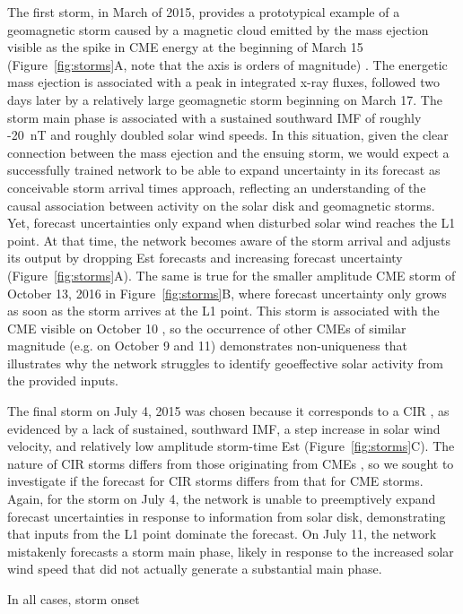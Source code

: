 The first storm, in March of 2015, provides a prototypical example of a geomagnetic storm caused by a magnetic cloud emitted by the mass ejection visible as the spike in CME energy at the beginning of March 15 (Figure~\ref{fig:storms}A, note that the axis is orders of magnitude) \citep{Patel2019}. The energetic mass ejection is associated with a peak in integrated x-ray fluxes, followed two days later by a relatively large geomagnetic storm beginning on March 17. The storm main phase is associated with a sustained southward IMF of roughly -20~nT and roughly doubled solar wind speeds. In this situation, given the clear connection between the mass ejection and the ensuing storm, we would expect a successfully trained network to be able to expand uncertainty in its forecast as conceivable storm arrival times approach, reflecting an understanding of the causal association between activity on the solar disk and geomagnetic storms. Yet, forecast uncertainties only expand when disturbed solar wind reaches the L1 point. At that time, the network becomes aware of the storm arrival and adjusts its output by dropping Est forecasts and increasing forecast uncertainty (Figure~\ref{fig:storms}A). The same is true for the smaller amplitude CME storm of October 13, 2016 in Figure~\ref{fig:storms}B, where forecast uncertainty only grows as soon as the storm arrives at the L1 point. This storm is associated with the CME visible on October 10 \citep{Patel2019}, so the occurrence of other CMEs of similar magnitude (e.g. on October 9 and 11) demonstrates non-uniqueness that illustrates why the network struggles to identify geoeffective solar activity from the provided inputs.

The final storm on July 4, 2015 was chosen because it corresponds to a CIR \citep{Shen2017}, as evidenced by a lack of sustained, southward IMF, a step increase in solar wind velocity, and relatively low amplitude storm-time Est (Figure~\ref{fig:storms}C). The nature of CIR storms differs from those originating from CMEs \citep{Zhang2007}, so we sought to investigate if the forecast for CIR storms differs from that for CME storms. Again, for the storm on July 4, the network is unable to preemptively expand forecast uncertainties in response to information from solar disk, demonstrating that inputs from the L1 point dominate the forecast. On July 11, the network mistakenly forecasts a storm main phase, likely in response to the increased solar wind speed that did not actually generate a substantial main phase.

In all cases,  storm onset 

